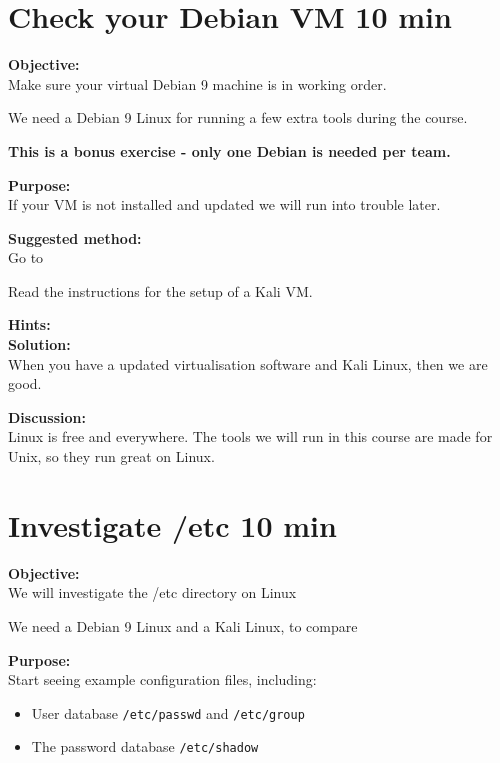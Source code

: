 \documentclass[a4paper,11pt,notitlepage]{report}
\begin{document}
\chapter{Check your Debian VM 10 min}
\label{ex:basicDebianVM}


{\bf Objective:}\\
Make sure your virtual Debian 9 machine is in working order.

We need a Debian 9 Linux for running a few extra tools during the course.

{\Large \bf This is a bonus exercise - only one Debian is needed per team.}

{\bf Purpose:}\\
If your VM is not installed and updated we will run into trouble later.

{\bf Suggested method:}\\
Go to 

Read the instructions for the setup of a Kali VM.

{\bf Hints:}\\

{\bf Solution:}\\
When you have a updated virtualisation software and Kali Linux, then we are good.

{\bf Discussion:}\\
Linux is free and everywhere. The tools we will run in this course are made for Unix, so they run great on Linux.



\chapter{Investigate /etc 10 min}
\label{ex:basicLinuxetc}


{\bf Objective:}\\
We will investigate the /etc directory on Linux

We need a Debian 9 Linux and a Kali Linux, to compare


{\bf Purpose:}\\
Start seeing example configuration files, including:
\begin{itemize}
  \item User database \verb+/etc/passwd+ and \verb+/etc/group+
  \item The password database \verb+/etc/shadow+
\end{itemize}
\end{document}
